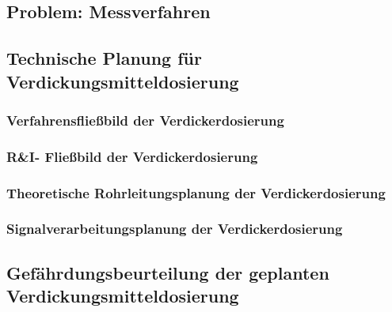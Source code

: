 
\subsection{Problem: Messverfahren}

\subsection{Technische Planung für Verdickungsmitteldosierung}
\subsubsection{Verfahrensfließbild der Verdickerdosierung}
\subsubsection{R\&I- Fließbild der Verdickerdosierung}
\subsubsection{Theoretische Rohrleitungsplanung der Verdickerdosierung}

\subsubsection{Signalverarbeitungsplanung der Verdickerdosierung}

\subsection{Gefährdungsbeurteilung der geplanten Verdickungsmitteldosierung}


